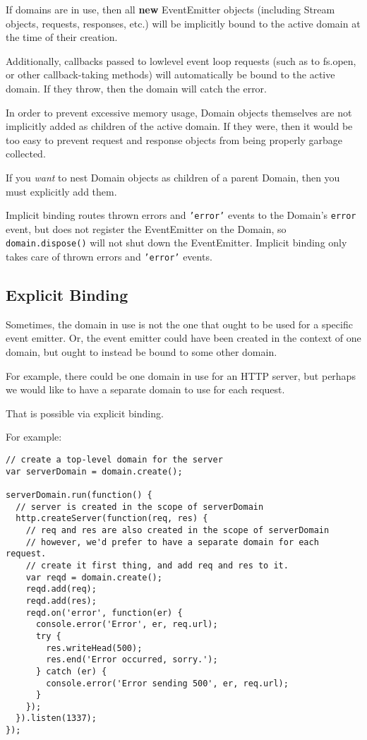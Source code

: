 If domains are in use, then all \textbf{new} EventEmitter objects
(including Stream objects, requests, responses, etc.) will be implicitly
bound to the active domain at the time of their creation.

Additionally, callbacks passed to lowlevel event loop requests (such as
to fs.open, or other callback-taking methods) will automatically be
bound to the active domain. If they throw, then the domain will catch
the error.

In order to prevent excessive memory usage, Domain objects themselves
are not implicitly added as children of the active domain. If they were,
then it would be too easy to prevent request and response objects from
being properly garbage collected.

If you \emph{want} to nest Domain objects as children of a parent
Domain, then you must explicitly add them.

Implicit binding routes thrown errors and \texttt{'error'} events to the
Domain's \texttt{error} event, but does not register the EventEmitter on
the Domain, so \texttt{domain.dispose()} will not shut down the
EventEmitter. Implicit binding only takes care of thrown errors and
\texttt{'error'} events.

\subsection{Explicit Binding}\label{explicit-binding}

Sometimes, the domain in use is not the one that ought to be used for a
specific event emitter. Or, the event emitter could have been created in
the context of one domain, but ought to instead be bound to some other
domain.

For example, there could be one domain in use for an HTTP server, but
perhaps we would like to have a separate domain to use for each request.

That is possible via explicit binding.

For example:

\begin{verbatim}
// create a top-level domain for the server
var serverDomain = domain.create();

serverDomain.run(function() {
  // server is created in the scope of serverDomain
  http.createServer(function(req, res) {
    // req and res are also created in the scope of serverDomain
    // however, we'd prefer to have a separate domain for each request.
    // create it first thing, and add req and res to it.
    var reqd = domain.create();
    reqd.add(req);
    reqd.add(res);
    reqd.on('error', function(er) {
      console.error('Error', er, req.url);
      try {
        res.writeHead(500);
        res.end('Error occurred, sorry.');
      } catch (er) {
        console.error('Error sending 500', er, req.url);
      }
    });
  }).listen(1337);
});
\end{verbatim}

